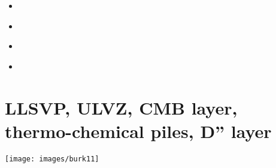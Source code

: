 \begin{scriptsize}
\begin{itemize}
\item[\twothousandsix]
\textcite{oebm06} 
\item[\twothousandthirteen]
\textcite{knyu13}  
\textcite{gami13} 
\textcite{klwh13}  
\textcite{sagy13} 
\item[\twothousandfourteen]
\textcite{zhzg14} 
\item[\twothousandfifteen]
\textcite{tact15} 
\end{itemize}
\end{scriptsize}

\section{LLSVP, ULVZ, CMB layer, thermo-chemical piles, D'' layer}

\begin{center}
\texttt{[image: images/burk11]}\cite{burk11}
\end{center}

